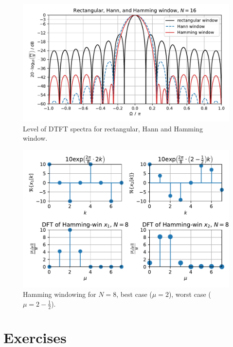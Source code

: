 \documentclass[11pt,a4paper,DIV=12]{scrartcl}
\begin{document}
\begin{figure}
		\centering
		\includegraphics[]{graphics/DTFTRectHanningHammingWin_log.pdf}
		\caption{Level of DTFT spectra for rectangular, Hann and Hamming
		window.}
		\label{DTFTRectHanningHammingWin_log}
\end{figure}
\begin{figure}
		\centering
		\includegraphics[]{graphics/DFTbestworstcase_HammWin.pdf}
		\caption{Hamming windowing for $N=8$, best case ($\mu=2$),
		worst case ($\mu=2-\frac{1}{2}$).}
		\label{DFTbestworstcase_HammWin}
\end{figure}

\cleardoublepage
\section{Exercises}

\end{document}
